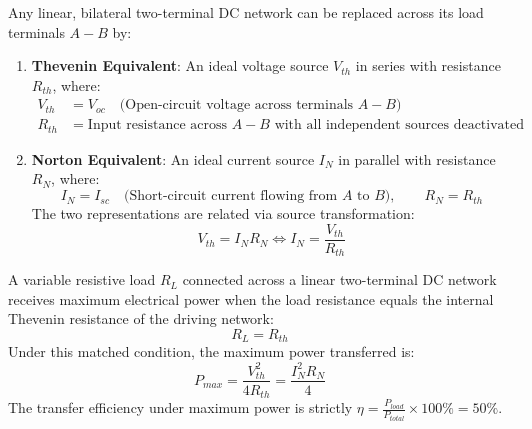\begin{theorem}
Any linear, bilateral two-terminal DC network can be replaced across its load terminals $A-B$ by:
\begin{enumerate}
    \item \textbf{Thevenin Equivalent}: An ideal voltage source $V_{th}$ in series with resistance $R_{th}$, where:
    \begin{align}
        V_{th} &= V_{oc} \quad \text{(Open-circuit voltage across terminals } A-B) \\
        R_{th} &= \text{Input resistance across } A-B \text{ with all independent sources deactivated}
    \end{align}
    \item \textbf{Norton Equivalent}: An ideal current source $I_N$ in parallel with resistance $R_N$, where:
    \begin{equation}
        I_N = I_{sc} \quad \text{(Short-circuit current flowing from } A \text{ to } B), \qquad R_N = R_{th}
    \end{equation}
    The two representations are related via source transformation:
    \begin{equation}
        V_{th} = I_N R_N \iff I_N = \frac{V_{th}}{R_{th}}
    \end{equation}
\end{enumerate}
\end{theorem}

\begin{theorem}
A variable resistive load $R_L$ connected across a linear two-terminal DC network receives maximum electrical power when the load resistance equals the internal Thevenin resistance of the driving network:
\begin{equation}
R_L = R_{th}
\end{equation}
Under this matched condition, the maximum power transferred is:
\begin{equation}
P_{max} = \frac{V_{th}^2}{4 R_{th}} = \frac{I_N^2 R_N}{4}
\end{equation}
The transfer efficiency under maximum power is strictly $\eta = \frac{P_{load}}{P_{total}} \times 100\% = 50\%$.
\end{theorem}


